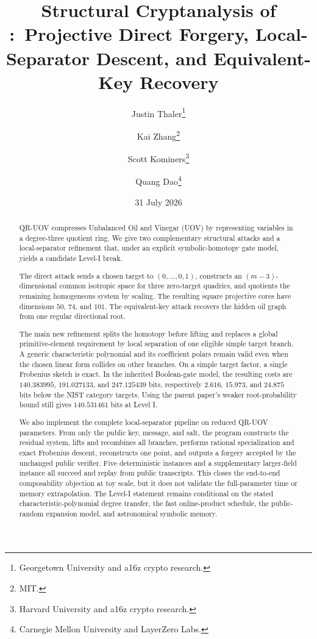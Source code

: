 \documentclass[11pt,a4paper]{article}
\title{\bfseries Structural Cryptanalysis of \QRUOV{}:\ Projective Direct Forgery, Local-Separator Descent, and Equivalent-Key Recovery}
\author{Justin Thaler\thanks{Georgetown University and a16z crypto research.}
\and Kai Zhang\thanks{MIT.}
\and Scott Kominers\thanks{Harvard University and a16z crypto research.}
\and Quang Dao\thanks{Carnegie Mellon University and LayerZero Labs.}}
\date{31 July 2026}
\theoremstyle{definition}
\theoremstyle{remark}
\newcommand{\QRUOV}{\textsf{QR-UOV}}
\begin{document}
\maketitle

\begin{abstract}
\QRUOV{} compresses Unbalanced Oil and Vinegar (UOV) by representing variables
in a degree-three quotient ring.  We give two complementary structural attacks
and a local-separator refinement that, under an explicit symbolic-homotopy gate
model, yields a candidate Level-I break.

The direct attack sends a chosen target to $(0,\ldots,0,1)$, constructs an
$(m-3)$-dimensional common isotropic space for three zero-target quadrics, and
quotients the remaining homogeneous system by scaling.  The resulting square
projective cores have dimensions $50$, $74$, and $101$.  The equivalent-key
attack recovers the hidden oil graph from one regular directional root.

The main new refinement splits the homotopy before lifting and replaces a
global primitive-element requirement by local separation of one eligible
simple target branch.  A generic characteristic polynomial and its coefficient
polars remain valid even when the chosen linear form collides on other branches.
On a simple target factor, a single Frobenius sketch is exact.  In the inherited
Boolean-gate model, the resulting costs are $140.383995$, $191.027133$, and
$247.125439$ bits, respectively $2.616$, $15.973$, and $24.875$ bits below the
NIST category targets.  Using the parent paper's weaker root-probability bound
still gives $140.531461$ bits at Level I.

We also implement the complete local-separator pipeline on reduced QR-UOV
parameters.  From only the public key, message, and salt, the program constructs
the residual system, lifts and recombines all branches, performs rational
specialization and exact Frobenius descent, reconstructs one point, and outputs
a forgery accepted by the unchanged public verifier.  Five deterministic
instances and a supplementary larger-field instance all succeed and replay
from public transcripts.  This closes the end-to-end composability objection at
toy scale, but it does not validate the full-parameter time or memory
extrapolation.  The Level-I statement remains conditional on the stated
characteristic-polynomial degree transfer, the fast online-product schedule,
the public-random expansion model, and astronomical symbolic memory.
\end{abstract}
\end{document}
